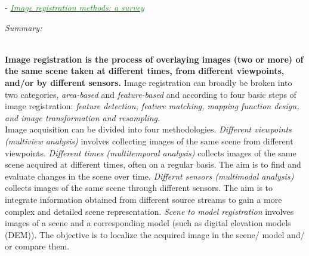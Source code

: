 \documentclass[]{article}
\newcommand{\paperentry}[4]{
            \hangindent=1cm
            \textcolor{red}{\cite{#1}} - \href{run:../References/#3}{\textcolor{ForestGreen}{\textit{#2}}}
            
            \noindent            
            \begin{minipage}[t]{0.1\linewidth}\hfill\end{minipage}
            \begin{minipage}[t]{0.8\linewidth}\textcolor{NavyBlue}{{\textit{Summary:}}}#4\end{minipage}
            \vspace{.25cm}
          }
\begin{document}
		\paperentry{Zitova2003SurveyImageRegistrationMethods}
		{Image registration methods: a survey}
		{Fusion/Reviews/Zitova2003SurveyImageRegistrationMethods.pdf}
		{}\\
		\textbf{Image registration is the process of overlaying images (two or more) of the same scene taken at different times, from different viewpoints, and/or by different sensors.}  Image registration can broadly be broken into two categories, \textit{area-based} and \textit{feature-based} and according to four basic steps of image registration: \textit{feature detection, feature matching, mapping function design, and image transformation and resampling.} \\
		\noindent
		Image acquisition can be divided into four methodologies.  \textit{Different viewpoints (multiview analysis)} involves collecting images of the same scene from different viewpoints.  \textit{Different times (multitemporal analysis)} collects images of the same scene acquired at different times, often on a regular basis.  The aim  is to find and  evaluate changes in the scene over time.  \textit{Differnt sensors (multimodal analysis)} collects images of the same scene through different sensors.  The aim is to integrate information obtained from different source streams to gain a more complex and detailed scene representation.  \textit{Scene to model registration} involves images of a scene and a corresponding model (such as digital elevation models (DEM)).  The objective is to localize the acquired image in the scene/ model and/ or compare them.\\
		\noindent
\end{document}
